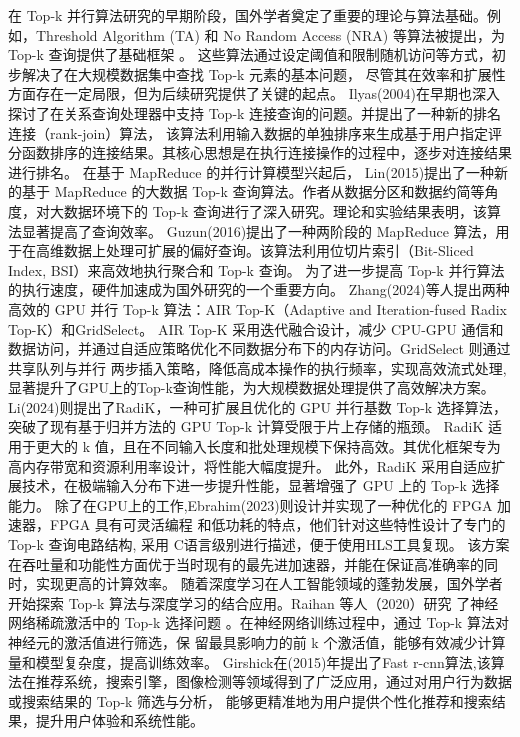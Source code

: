 在 Top-k 并行算法研究的早期阶段，国外学者奠定了重要的理论与算法基础。例如，Threshold Algorithm (TA) 和 No Random Access 
(NRA) 等算法被提出，为 Top-k 查询提供了基础框架 \cite {fagin2001optimal}。
这些算法通过设定阈值和限制随机访问等方式，初步解决了在大规模数据集中查找 Top-k 元素的基本问题，
尽管其在效率和扩展性方面存在一定局限，但为后续研究提供了关键的起点。
Ilyas(2004)在早期也深入探讨了在关系查询处理器中支持 Top-k 连接查询的问题\cite{ilyas2004supporting}。并提出了一种新的排名连接（rank-join）算法，
该算法利用输入数据的单独排序来生成基于用户指定评分函数排序的连接结果。其核心思想是在执行连接操作的过程中，逐步对连接结果进行排名。
在基于 MapReduce 的并行计算模型兴起后，
Lin(2015)提出了一种新的基于 MapReduce 的大数据 Top-k 查询算法\cite{lin2015top}。作者从数据分区和数据约简等角度，对大数据环境下的 Top-k 查询进行了深入研究。理论和实验结果表明，该算法显著提高了查询效率。
Guzun(2016)提出了一种两阶段的 MapReduce 算法\cite{guzun2016two}，用于在高维数据上处理可扩展的偏好查询。该算法利用位切片索引（Bit-Sliced Index, BSI）来高效地执行聚合和 Top-k 查询。
为了进一步提高 Top-k 并行算法的执行速度，硬件加速成为国外研究的一个重要方向。
Zhang(2024)等人提出两种高效的 GPU 并行 Top-k 算法：AIR Top-K（Adaptive and Iteration-fused Radix Top-K）和GridSelect\cite{zhang2023parallel}。
AIR Top-K 采用迭代融合设计，减少 CPU-GPU 通信和数据访问，并通过自适应策略优化不同数据分布下的内存访问。GridSelect 则通过共享队列与并行
两步插入策略，降低高成本操作的执行频率，实现高效流式处理,显著提升了GPU上的Top-k查询性能，为大规模数据处理提供了高效解决方案。
Li(2024)则提出了RadiK，一种可扩展且优化的 GPU 并行基数 Top-k 选择算法\cite{li2024radik}，突破了现有基于归并方法的 GPU Top-k 计算受限于片上存储的瓶颈。
RadiK 适用于更大的 k 值，且在不同输入长度和批处理规模下保持高效。其优化框架专为高内存带宽和资源利用率设计，将性能大幅度提升。
此外，RadiK 采用自适应扩展技术，在极端输入分布下进一步提升性能，显著增强了 GPU 上的 Top-k 选择能力。
除了在GPU上的工作,Ebrahim(2023)则设计并实现了一种优化的 FPGA 加速器，FPGA 具有可灵活编程
和低功耗的特点，他们针对这些特性设计了专门的 Top-k 查询电路结构\cite{ebrahim2023finding}, 采用 C语言级别进行描述，便于使用HLS工具复现。
该方案在吞吐量和功能性方面优于当时现有的最先进加速器，并能在保证高准确率的同时，实现更高的计算效率。
随着深度学习在人工智能领域的蓬勃发展，国外学者开始探索 Top-k 算法与深度学习的结合应用。Raihan 等人（2020）研究
了神经网络稀疏激活中的 Top-k 选择问题 \cite {raihan2020sparse}。在神经网络训练过程中，通过 Top-k 算法对神经元的激活值进行筛选，保
留最具影响力的前 k 个激活值，能够有效减少计算量和模型复杂度，提高训练效率。
Girshick在(2015)年提出了Fast r-cnn算法,该算法在推荐系统，搜索引擎，图像检测等领域得到了广泛应用，通过对用户行为数据或搜索结果的 Top-k 筛选与分析，
能够更精准地为用户提供个性化推荐和搜索结果，提升用户体验和系统性能\cite{girshick2015fast}。

